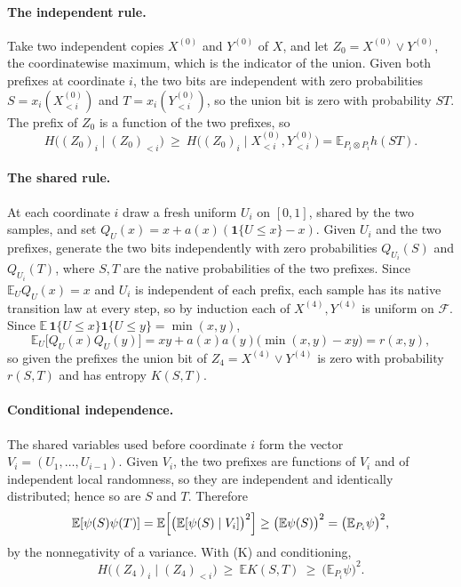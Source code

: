 \documentclass[aps,prd,twocolumn,superscriptaddress,nofootinbib,longbibliography,floatfix,amsmath,amssymb,10pt]{revtex4-2}
\theoremstyle{plain}
\theoremstyle{definition}
\theoremstyle{plain}
\newcommand{\EE}{\mathbb{E}}
\newcommand{\cF}{\mathcal{F}}
\begin{document}
\paragraph*{The independent rule.} Take two independent copies $X^{(0)}$ and $Y^{(0)}$ of $X$, and let $Z_0=X^{(0)}\vee Y^{(0)}$, the coordinatewise maximum, which is the indicator of the union. Given both prefixes at coordinate $i$, the two bits are independent with zero probabilities $S=x_i(X^{(0)}_{<i})$ and $T=x_i(Y^{(0)}_{<i})$, so the union bit is zero with probability $ST$. The prefix of $Z_0$ is a function of the two prefixes, so
\begin{equation}\label{eq:Z0}
H\bigl((Z_0)_i\mid(Z_0)_{<i}\bigr)\ \ge\ H\bigl((Z_0)_i\mid X^{(0)}_{<i},Y^{(0)}_{<i}\bigr)=\EE_{P_i\otimes P_i}h(ST).
\end{equation}

\paragraph*{The shared rule.} At each coordinate $i$ draw a fresh uniform $U_i$ on $[0,1]$, shared by the two samples, and set $Q_{U}(x)=x+a(x)(\mathbf 1\{U\le x\}-x)$. Given $U_i$ and the two prefixes, generate the two bits independently with zero probabilities $Q_{U_i}(S)$ and $Q_{U_i}(T)$, where $S,T$ are the native probabilities of the two prefixes. Since $\EE_U Q_U(x)=x$ and $U_i$ is independent of each prefix, each sample has its native transition law at every step, so by induction each of $X^{(4)},Y^{(4)}$ is uniform on $\cF$. Since $\EE\,\mathbf 1\{U\le x\}\mathbf 1\{U\le y\}=\min(x,y)$,
\[
\EE_U\bigl[Q_U(x)Q_U(y)\bigr]=xy+a(x)a(y)\bigl(\min(x,y)-xy\bigr)=r(x,y),
\]
so given the prefixes the union bit of $Z_4=X^{(4)}\vee Y^{(4)}$ is zero with probability $r(S,T)$ and has entropy $K(S,T)$.

\paragraph*{Conditional independence.} The shared variables used before coordinate $i$ form the vector $V_i=(U_1,\dots,U_{i-1})$. Given $V_i$, the two prefixes are functions of $V_i$ and of independent local randomness, so they are independent and identically distributed; hence so are $S$ and $T$. Therefore
\[
\EE[\psi(S)\psi(T)]=\EE\Bigl[\bigl(\EE[\psi(S)\mid V_i]\bigr)^2\Bigr]\ge\bigl(\EE\psi(S)\bigr)^2=\bigl(\EE_{P_i}\psi\bigr)^2,
\]
by the nonnegativity of a variance. With (K) and conditioning,
\begin{equation}\label{eq:Z4}
H\bigl((Z_4)_i\mid(Z_4)_{<i}\bigr)\ \ge\ \EE K(S,T)\ \ge\ \bigl(\EE_{P_i}\psi\bigr)^2 .
\end{equation}
\end{document}
